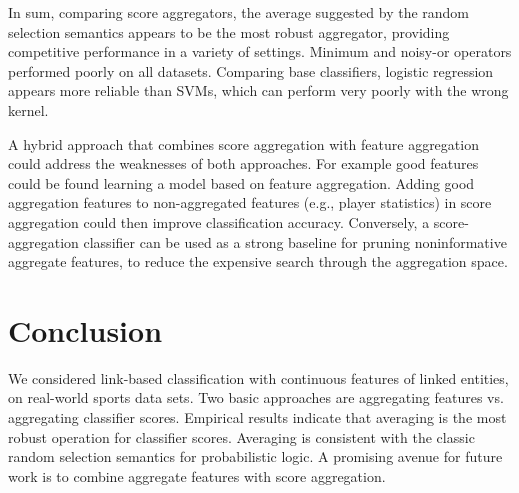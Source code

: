 \documentclass[oribibl]{llncs}%
\begin{document}
In sum, comparing score aggregators, the average suggested by the random selection semantics appears to be the most robust aggregator, providing competitive performance in a variety of settings. Minimum and noisy-or operators performed poorly on all datasets. Comparing base classifiers, logistic regression appears more reliable than SVMs, which can perform very poorly with the wrong kernel.



A hybrid approach that combines score aggregation with feature aggregation could address the weaknesses of both approaches. 
For example good features could be found learning a model based on feature aggregation. Adding  good aggregation features to non-aggregated features (e.g., player statistics) in score aggregation could then improve classification accuracy. Conversely, a score-aggregation classifier can be used as a strong baseline for pruning noninformative aggregate features, to reduce the expensive search through the aggregation space.


\section{Conclusion} We considered link-based classification with continuous features of linked entities, on real-world sports data sets. Two basic approaches are aggregating features vs. aggregating classifier scores. Empirical results indicate that averaging is the most robust operation for classifier scores. Averaging is consistent with the classic random selection semantics for probabilistic logic. A promising avenue for future work is to combine aggregate features with score aggregation. 




%


%

\end{document}

